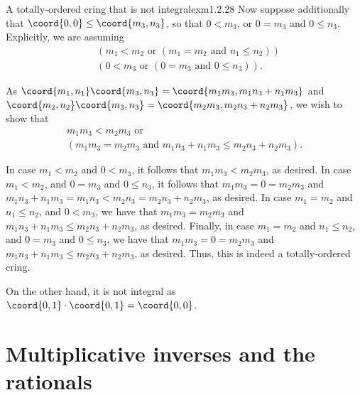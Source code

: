 \begin{exm}{A totally-ordered cring that is not integral}{exm1.2.28}
Now suppose additionally that $\coord{0,0}\leq \coord{m_3,n_3}$, so that $0<m_3$, or $0=m_3$ and $0\leq n_3$.  Explicitly, we are assuming
\begin{equation}
\begin{aligned}
&\left( m_1<m_2\text{ or }\left( m_1=m_2\text{ and }n_1\leq n_2\right) \right) \\ &\left( 0<m_3\text{ or }\left( 0=m_3\text{ and }0\leq n_3\right) \right) .
\end{aligned}
\end{equation}

As $\coord{m_1,n_1}\coord{m_3,n_3}=\coord{m_1m_3,m_1n_3+n_1m_3}$ and $\coord{m_2,n_2}\coord{m_3,n_3}=\coord{m_2m_3,m_2n_3+n_2m_3}$, we wish to show that
\begin{equation}
\begin{multlined}
m_1m_3<m_2m_3\text{ or } \\ \left( m_1m_3=m_2m_3\text{ and }m_1n_3+n_1m_3\leq m_2n_3+n_2m_3\right) .
\end{multlined}
\end{equation}

In case $m_1<m_2$ and $0<m_3$, it follows that $m_1m_3<m_2m_3$, as desired.  In case $m_1<m_2$, and $0=m_3$ and $0\leq n_3$, it follows that $m_1m_3=0=m_2m_3$ and $m_1n_3+n_1m_3=m_1n_3<m_2n_3=m_2n_3+n_2m_3$, as desired.  In case $m_1=m_2$ and $n_1\leq n_2$, and $0<m_3$, we have that $m_1m_3=m_2m_3$ and $m_1n_3+n_1m_3\leq m_2n_3+n_2m_3$, as desired.  Finally, in case $m_1=m_2$ and $n_1\leq n_2$, and $0=m_3$ and $0\leq n_3$, we have that $m_1m_3=0=m_2m_3$ and $m_1n_3+n_1m_3\leq m_2n_3+n_2m_3$, as desired.  Thus, this is indeed a totally-ordered cring.

On the other hand, it is not integral as $\coord{0,1}\cdot \coord{0,1}=\coord{0,0}$.
\end{exm}

\section{Multiplicative inverses and the rationals}

